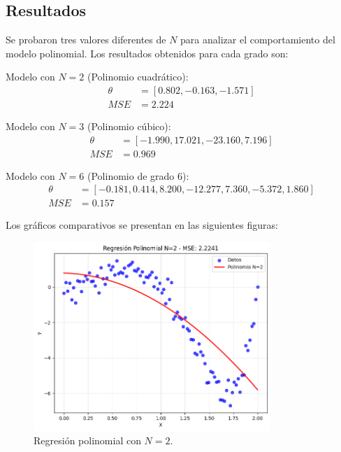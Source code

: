 \documentclass{article}
\begin{document}
\subsection{Resultados}
\setcounter{equation}{0}

Se probaron tres valores diferentes de $N$ para analizar el comportamiento del modelo polinomial. Los resultados obtenidos para cada grado son:

Modelo con $N=2$ (Polinomio cuadrático):
\begin{align}
    \theta &= [0.802, -0.163, -1.571] \\
    MSE &= 2.224
\end{align}

Modelo con $N=3$ (Polinomio cúbico):
\begin{align}
    \theta &= [-1.990, 17.021, -23.160, 7.196] \\
    MSE &= 0.969
\end{align}

Modelo con $N=6$ (Polinomio de grado 6):
\begin{align}
    \theta &= [-0.181, 0.414, 8.200, -12.277, 7.360, -5.372, 1.860] \\
    MSE &= 0.157
\end{align}

Los gráficos comparativos se presentan en las siguientes figuras:

\begin{figure}[H]
    \centering
    \includegraphics[width=0.8\textwidth]{images/8_N2.png}
    \caption{Regresión polinomial con $N=2$.}
\end{figure}
\end{document}
